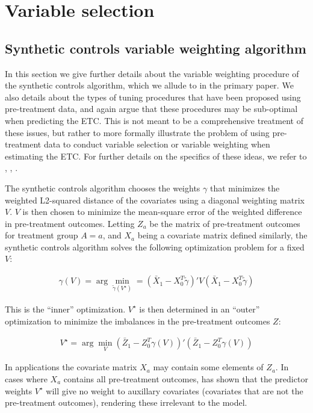 \section{Variable selection}\label{ssec:varselection}

\subsection{Synthetic controls variable weighting algorithm}

In this section we give further details about the variable weighting procedure of the synthetic controls algorithm, which we allude to in the primary paper. We also details about the types of tuning procedures that have been proposed using pre-treatment data, and again argue that these procedures may be sub-optimal when predicting the ETC. This is not meant to be a comprehensive treatment of these issues, but rather to more formally illustrate the problem of using pre-treatment data to conduct variable selection or variable weighting when estimating the ETC. For further details on the specifics of these ideas, we refer to \cite{abadie2010synthetic}, \cite{abadie2015comparative}, \cite{kaul2015synthetic}.

The synthetic controls algorithm chooses the weights $\gamma$ that minimizes the weighted L2-squared distance of the covariates using a diagonal weighting matrix $V$. $V$ is then chosen to minimize the mean-square error of the weighted difference in pre-treatment outcomes. Letting $Z_a$ be the matrix of pre-treatment outcomes for treatment group $A = a$, and $X_a$ being a covariate matrix defined similarly, the synthetic controls algorithm solves the following optimization problem for a fixed $V$:

\begin{align}
\gamma(V) = \arg\min_{\tilde{\gamma}(V^\star)} = (\bar{X}_1 - X_0^T\tilde{\gamma})'V(\bar{X}_1 - X_0^T\tilde{\gamma}) 
\end{align}

This is the ``inner'' optimization. $V^\star$ is then determined in an ``outer'' optimization to minimize the imbalances in the pre-treatment outcomes $Z$:

\begin{align}
    V^\star = \arg\min_V (\bar{Z}_1 - Z_0^T\gamma(V))'(\bar{Z}_1 - Z_0^T\gamma(V))
\end{align}

In applications the covariate matrix $X_a$ may contain some elements of $Z_a$. In cases where $X_a$ contains all pre-treatment outcomes, \cite{kaul2015synthetic} has shown that the predictor weights $V^\star$ will give no weight to auxillary covariates (covariates that are not the pre-treatment outcomes), rendering these irrelevant to the model. 

